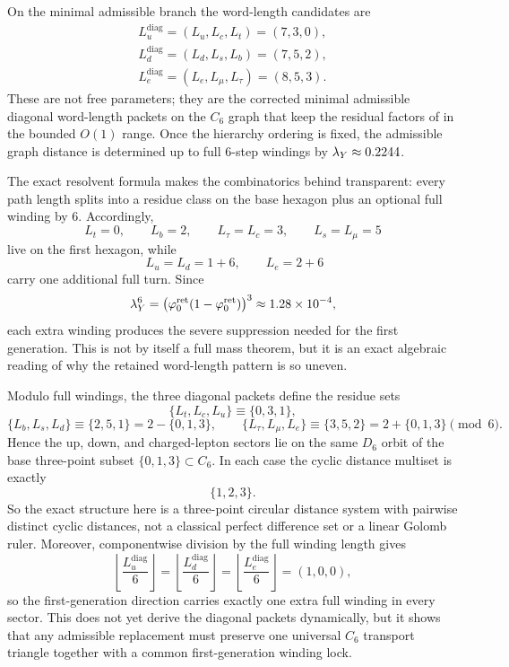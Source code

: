 
On the minimal admissible branch the word-length candidates are
\begin{equation}
\label{eq:minimal-word-lengths}
\begin{gathered}
L_u^{\mathrm{diag}}=(L_u,L_c,L_t)=(7,3,0),\\
L_d^{\mathrm{diag}}=(L_d,L_s,L_b)=(7,5,2),\\
L_e^{\mathrm{diag}}=(L_e,L_\mu,L_\tau)=(8,5,3).
\end{gathered}
\end{equation}
These are not free parameters; they are the corrected minimal admissible diagonal word-length packets on the $C_6$ graph that keep the residual factors of  in the bounded $O(1)$ range. Once the hierarchy ordering is fixed, the admissible graph distance is determined up to full $6$-step windings by $\lambda_Y\approx\num{0.2244}$.

\begin{remark}
The exact resolvent formula  makes the combinatorics behind  transparent: every path length splits into a residue class on the base hexagon plus an optional full winding by $6$. Accordingly,
\[
L_t=0,\qquad
L_b=2,\qquad
L_\tau=L_c=3,\qquad
L_s=L_\mu=5
\]
live on the first hexagon, while
\[
\;L_u=L_d=1+6,
\qquad
L_e=2+6
\]
carry one additional full turn. Since
\[
\lambda_Y^6=\bigl(\varphi_0^{\mathrm{ret}}(1-\varphi_0^{\mathrm{ret}})\bigr)^3\approx \num{1.28e-4},
\]
each extra winding produces the severe suppression needed for the first generation. This is not by itself a full mass theorem, but it is an exact algebraic reading of why the retained word-length pattern is so uneven.
\end{remark}

\begin{remark}
Modulo full windings, the three diagonal packets define the residue sets
\[
\{L_t,L_c,L_u\}\equiv\{0,3,1\},
\]
\[
\{L_b,L_s,L_d\}\equiv\{2,5,1\}=2-\{0,1,3\},
\qquad
\{L_\tau,L_\mu,L_e\}\equiv\{3,5,2\}=2+\{0,1,3\}
\pmod 6.
\]
Hence the up, down, and charged-lepton sectors lie on the same $D_6$ orbit of the base three-point subset $\{0,1,3\}\subset C_6$. In each case the cyclic distance multiset is exactly
\[
\{1,2,3\}.
\]
So the exact structure here is a three-point circular distance system with pairwise distinct cyclic distances, not a classical perfect difference set or a linear Golomb ruler.
Moreover, componentwise division by the full winding length gives
\[
\left\lfloor\frac{L_u^{\mathrm{diag}}}{6}\right\rfloor
=
\left\lfloor\frac{L_d^{\mathrm{diag}}}{6}\right\rfloor
=
\left\lfloor\frac{L_e^{\mathrm{diag}}}{6}\right\rfloor
=(1,0,0),
\]
so the first-generation direction carries exactly one extra full winding in every sector. This does not yet derive the diagonal packets dynamically, but it shows that any admissible replacement must preserve one universal $C_6$ transport triangle together with a common first-generation winding lock.
\end{remark}

